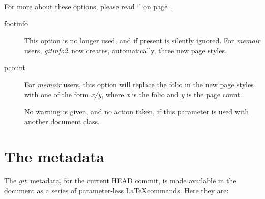 \documentclass[a4paper,12pt,twoside,openany]{memoir}
\newcommand{\sfit}[1]{\textit{#1}}
\newcommand{\git}{\sfit{git}}
\newcommand{\tpname}{\sfit{gitinfo2}}
\begin{document}
For more about these options,
please read
`'
on page~\pageref*{sect:memuser}.

\begin{description}

\item[footinfo]
This option is no longer used, and if present is silently ignored.
For \sfit{memoir} users, \tpname\ now creates, automatically,
three new page styles.

\item[pcount]
For \sfit{memoir} users, this option will replace the folio
in the new page styles with one of the form \textit{x/y},
where \textit{x} is the folio and \textit{y} is the page count.

No warning is given, and no action taken,
if this parameter is used with another document class.

\end{description}
\clearpage
\section{The metadata}
The \git\ metadata, for the current HEAD commit,
is made available in the document
as a series of parameter-less \LaTeX commands.
Here they are:
\end{document}
